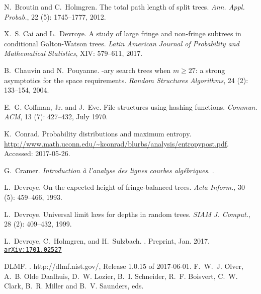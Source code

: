 \documentclass[11pt]{article}
\numberwithin{theorem}{section}
\theoremstyle{definition}
\numberwithin{equation}{section}
\begin{document}
\begin{thebibliography}{55}
N.~Broutin and C.~Holmgren.
\newblock The total path length of split trees.
\newblock \emph{Ann. Appl. Probab.}, 22 (5): 1745--1777,
  2012.

X.~S. Cai and L.~Devroye.
\newblock A study of large fringe and non-fringe subtrees in conditional
  {Galton-Watson} trees.
\newblock \emph{Latin American Journal of Probability and Mathematical
  Statistics}, XIV: 579--611, 2017.

B.~Chauvin and N.~Pouyanne.
-ary search trees when {$m\ge27$}: a strong asymptotics for the
  space requirements.
\newblock \emph{Random Structures Algorithms}, 24 (2):
  133--154, 2004.

E.~G. Coffman, Jr. and J.~Eve.
\newblock File structures using hashing functions.
\newblock \emph{Commun. ACM}, 13 (7): 427--432, July 1970.

K.~Conrad.
\newblock Probability distributions and maximum entropy.
\newblock
  \url{http://www.math.uconn.edu/~kconrad/blurbs/analysis/entropypost.pdf}.
\newblock Accessed: 2017-05-26.

G.~Cramer.
\newblock \emph{Introduction {\`a} l'analyse des lignes courbes
  alg{\'e}briques}.
.

L.~Devroye.
\newblock On the expected height of fringe-balanced trees.
\newblock \emph{Acta Inform.}, 30 (5): 459--466, 1993.

L.~Devroye.
\newblock Universal limit laws for depths in random trees.
\newblock \emph{SIAM J. Comput.}, 28 (2): 409--432, 1999.

L.~{Devroye}, C.~{Holmgren}, and H.~{Sulzbach}.
.
\newblock Preprint, Jan. 2017.
\href{https://arxiv.org/abs/1701.02527}{\nolinkurl{arXiv:1701.02527}}

{\relax DLMF}.
.
\newblock http://dlmf.nist.gov/, Release 1.0.15 of 2017-06-01.
\newblock F.~W.~J. Olver, A.~B. {Olde Daalhuis}, D.~W. Lozier, B.~I. Schneider,
  R.~F. Boisvert, C.~W. Clark, B.~R. Miller and B.~V. Saunders, eds.


\end{thebibliography}
\end{document}
